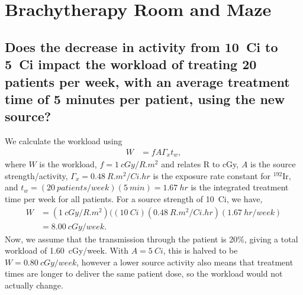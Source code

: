 \documentclass[%
aps,
mph,%
amsmath,amssymb,
preprint,%
tightenlines,
longbibliography,
superscriptaddress,
floatfix,
nofootinbib,
]{revtex4-2}
\begin{document}
\section{Brachytherapy Room and Maze}
    \subsection{Does the decrease in activity from \SI{10}{Ci} to \SI{5}{Ci} impact the workload of treating 20 patients per week, with an average treatment time of 5 minutes per patient, using the new source?}
    We calculate the workload using
    \begin{align}
        W &= f A \Gamma_x t_w,
    \end{align}
    where $W$ is the workload, $f = \qty{1}{cGy/R.m^2}$ and relates R to cGy, $A$ is the source strength/activity, $\Gamma_x = \SI{0.48}{R.m^2/Ci.hr}$ is the exposure rate constant for $^{192}\mathrm{Ir}$, and $t_w = \left( \qty{20}{patients/week} \right)\left(\qty{5}{min}\right) = \qty{1.67}{hr}$ is the integrated treatment time per week for all patients. For a source strength of \SI{10}{Ci}, we have,
    \begin{align*}
        W &= \left(\qty{1}{cGy/R.m^2}\right)(\left( \SI{10}{Ci} \right) \left( \SI{0.48}{R.m^2/Ci.hr} \right) \left( \qty{1.67}{hr/week} \right) \\
        &= \qty{8.00}{cGy/week}.
    \end{align*}
    Now, we assume that the transmission through the patient is 20\%, giving a total workload of \qty{1.60}{cGy/week}. With $A = \SI{5}{Ci}$, this is halved to be $W = \qty{0.80}{cGy/week}$, however a lower source activity also means that treatment times are longer to deliver the same patient dose, so the workload would not actually change.
\end{document}
